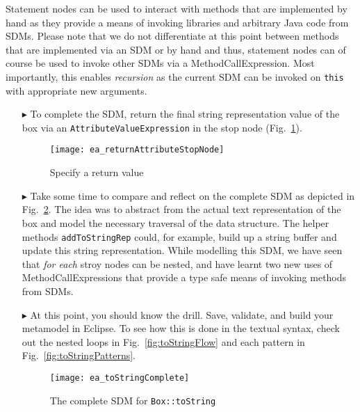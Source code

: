 Statement nodes can be used to interact with methods that are implemented by hand as they provide a means of invoking libraries and arbitrary Java code from
SDMs. Please note that we do not differentiate at this point between methods that are implemented via an SDM or by hand and thus, statement nodes can of course
be used to invoke other SDMs via a MethodCallExpression. Most importantly, this enables \emph{recursion} as the current SDM can be invoked on \texttt{this} with
appropriate new arguments.

\newpage

\begin{itemize}

\item[$\blacktriangleright$] To complete the SDM, return the final string representation value of the box via an \texttt{AttributeValueExpression} in
the stop node (Fig.~\ref{fig:toStringStopNode}).

\vspace{0.5cm}

\begin{figure}[htbp]
\begin{center}
  \texttt{[image: ea\_returnAttributeStopNode]}
  \caption{Specify a return value}
  \label{fig:toStringStopNode}
\end{center}
\end{figure}

\vspace{0.5cm}

\item[$\blacktriangleright$] Take some time to compare and reflect on the complete SDM as depicted in Fig.~\ref{fig:sdm_tostring_5}.  The idea was to abstract
from the actual text representation of the box and model the necessary traversal of the data structure. The helper methods \texttt{addToStringRep} could, for example, build up a
string buffer and update this string representation. While modelling this SDM, we have seen that \emph{for each} stroy nodes can be nested, and have learnt two
new uses of MethodCallExpressions that provide a type safe means of invoking methods from SDMs.

\vspace{0.5cm}

\item[$\blacktriangleright$] At this point, you should know the drill. Save, validate, and build your metamodel in Eclipse. To see how this is done in the
textual syntax, check out the nested loops in Fig.~\ref{fig:toStringFlow} and each pattern in Fig.~\ref{fig:toStringPatterns}.

\newpage

\vspace*{2cm}

\begin{figure}[htbp]
\begin{center}
  \texttt{[image: ea\_toStringComplete]}
  \caption{The complete SDM for \texttt{Box::toString}}  
  \label{fig:sdm_tostring_5}
\end{center}
\end{figure}
\FloatBarrier


\end{itemize}
